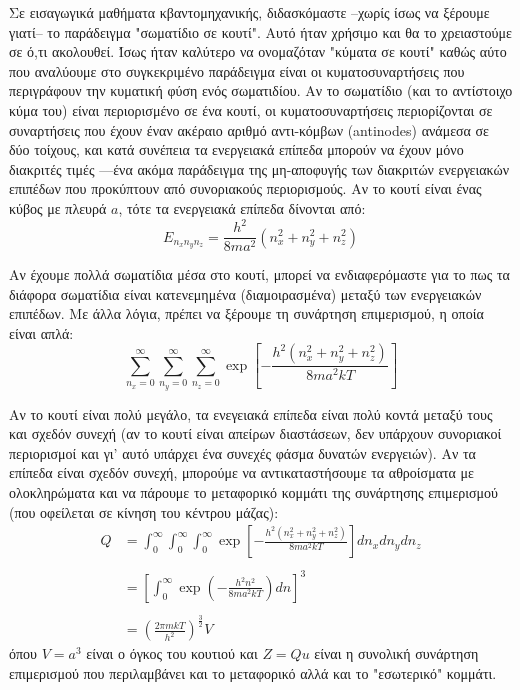 Σε εισαγωγικά μαθήματα κβαντομηχανικής, διδασκόμαστε --χωρίς ίσως να ξέρουμε γιατί-- το παράδειγμα "σωματίδιο σε κουτί". Αυτό ήταν χρήσιμο και θα το χρειαστούμε σε ό,τι ακολουθεί. Ίσως ήταν καλύτερο να ονομαζόταν "κύματα σε κουτί" καθώς αύτο που αναλύουμε στο συγκεκριμένο παράδειγμα είναι οι κυματοσυναρτήσεις που περιγράφουν την κυματική φύση ενός σωματιδίου. Αν το σωματίδιο (και το αντίστοιχο κύμα του) είναι περιορισμένο σε ένα κουτί, οι κυματοσυναρτήσεις περιορίζονται σε συναρτήσεις που έχουν έναν ακέραιο αριθμό αντι-κόμβων (antinodes) ανάμεσα σε δύο τοίχους, και κατά συνέπεια τα ενεργειακά επίπεδα μπορούν να έχουν μόνο διακριτές τιμές ---ένα ακόμα παράδειγμα της μη-αποφυγής των διακριτών ενεργειακών επιπέδων που προκύπτουν από συνοριακούς περιορισμούς. Αν το κουτί είναι ένας κύβος με πλευρά $a$, τότε τα ενεργειακά επίπεδα δίνονται από:
\begin{equation}
    \label{eq:apx:discrete_energy_levels_box}
    E_{n_x n_y n_z} = \frac{h^2}{8ma^2} \left(n^2_x + n^2_y + n^2_z \right)
\end{equation}

Αν έχουμε πολλά σωματίδια μέσα στο κουτί, μπορεί να ενδιαφερόμαστε για το πως τα διάφορα σωματίδια είναι κατενεμημένα (διαμοιρασμένα) μεταξύ των ενεργειακών επιπέδων. Με άλλα λόγια, πρέπει να ξέρουμε τη συνάρτηση επιμερισμού, η οποία είναι απλά:
\begin{equation}
    \label{eq:apx:box_partition_function_discrete}
    \sum_{n_x=0}^\infty \sum_{n_y=0}^\infty \sum_{n_z=0}^\infty \exp \left[ - \frac{h^2 \left(n_x^2 + n_y^2 + n_z^2 \right)}{8ma^2kT} \right]
\end{equation}

Αν το κουτί είναι πολύ μεγάλο, τα ενεγειακά επίπεδα είναι πολύ κοντά μεταξύ τους και σχεδόν συνεχή (αν το κουτί είναι απείρων διαστάσεων, δεν υπάρχουν συνοριακοί περιορισμοί και γι' αυτό υπάρχει ένα συνεχές φάσμα δυνατών ενεργειών). Αν τα επίπεδα είναι σχεδόν συνεχή, μπορούμε να αντικαταστήσουμε τα αθροίσματα με ολοκληρώματα και να πάρουμε το μεταφορικό κομμάτι της συνάρτησης επιμερισμού (που οφείλεται σε κίνηση του κέντρου μάζας):
\begin{align}
    \label{eq:apx:box_partition_function_integrals}
    \nonumber Q &= \int_0^\infty \int_0^\infty \int_0^\infty \exp \left[ - \frac{h^2 \left( n_x^2 + n_y^2 + n_z^2 \right)}{8ma^2kT } \right] dn_x dn_y dn_z \nonumber \\ \nonumber \\
    &=\left[ \int_0^\infty \exp \left( - \frac{h^2 n^2}{8ma^2kT } \right) dn \right]^3 \nonumber \\ \nonumber \\
    &= \left(\frac{2 \pi mkT}{h^2} \right)^{\frac{3}{2}} V
\end{align}
όπου $V = a^3$ είναι ο όγκος του κουτιού και $Z=Qu$ είναι η συνολική συνάρτηση επιμερισμού που περιλαμβάνει και το μεταφορικό αλλά και το "εσωτερικό" κομμάτι.




